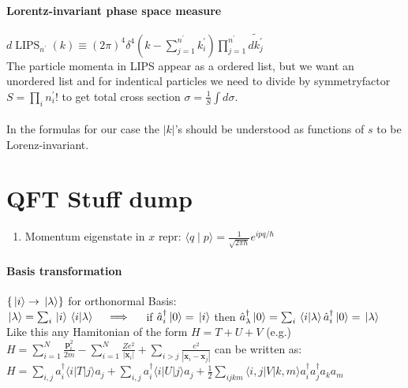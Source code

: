 \paragraph{Lorentz-invariant phase space measure} $d \operatorname{LIPS}_{n^{\prime}}(k) \equiv(2 \pi)^4 \delta^4\left(k-\sum_{j=1}^{n^{\prime}} k_i^{\prime}\right) \prod_{j=1}^{n^{\prime}} \widetilde{d k_j^{\prime}}$\\
The particle momenta in LIPS appear as a ordered list, but we want an unordered list and for indentical particles we 
need to divide by symmetryfactor $S=\prod_i n_i^{\prime} !$ to get total cross section $\sigma=\frac{1}{S} \int d \sigma$.\\
 \\
In the formulas for our case the $|k|$'s should be understood as functions of $s$ to be Lorenz-invariant.

\section{QFT Stuff dump}

\begin{enumerate}
  \item Momentum eigenstate in $x$ repr: $\langle q \mid p\rangle=\frac{1}{\sqrt{2 \pi \hbar}} e^{i p q / \hbar}$
\end{enumerate}

\paragraph{Basis transformation} $\{ \ket*{i} \to \ket*{\lambda} \}$  for orthonormal Basis:\\ 
$\ket*{\lambda } = \sum_i \ket*{i} \braket*{i}{\lambda} \quad   \implies  \quad $ if $\hat{a}_i^\dagger \ket*{0} = \ket*{i}$ then 
$\hat{a}_\lambda^\dagger \ket*{0} = \sum_i \braket*{i}{\lambda} \hat{a}_i^\dagger \ket{0} = \ket*{\lambda} $\\

Like this any Hamitonian of the form $H=T+U+V$ (e.g.) \\ 
$H=\sum_{i=1}^N \frac{\mathbf{p}_i^2}{2 m}-\sum_{i=1}^N \frac{Z e^2}{\left|\mathbf{x}_i\right|}+\sum_{i>j} \frac{e^2}{\left|\mathbf{x}_i-\mathbf{x}_j\right|}$
can be written as:\\
$H=\sum_{i, j} a_i^{\dagger}\langle i|T| j\rangle a_j+\sum_{i, j} a_i^{\dagger}\langle i|U| j\rangle a_j+\frac{1}{2} \sum_{i j k m}\langle i, j|V| k, m\rangle a_i^{\dagger} a_j^{\dagger} a_k a_m$


